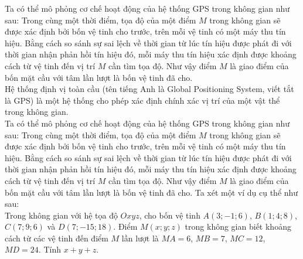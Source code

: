 \begin{bt}
{
	}
	Ta có thể mô phỏng cơ chế hoạt động của hệ thống GPS trong không gian như sau: Trong cùng một thời điểm, tọa độ của một điểm $M$ trong không gian sẽ được xác định bởi bốn vệ tinh cho trước, trên mỗi vệ tinh có một máy thu tín hiệu. Bằng cách so sánh sự sai lệch về thời gian từ lúc tín hiệu được phát đi với thời gian nhận phản hồi tín hiệu đó, mỗi máy thu tín hiệu xác định được khoảng cách từ vệ tinh đến vị trí $M$ cần tìm tọa độ. Như vậy điểm $M$ là giao điểm của bốn mặt cầu với tâm lần lượt là bốn vệ tinh đã cho.	\\
	Hệ thống định vị toàn cầu (tên tiếng Anh là Global Positioning System, viết tắt là GPS) là một hệ thống cho phép xác định chính xác vị trí của một vật thể trong không gian.\\
	Ta có thể mô phỏng cơ chế hoạt động của hệ thống GPS trong không gian như sau: Trong cùng một thời điểm, tọa độ của một điểm $M$ trong không gian sẽ được xác định bởi bốn vệ tinh cho trước, trên mỗi vệ tinh có một máy thu tín hiệu. Bằng cách so sánh sự sai lệch về thời gian từ lúc tín hiệu được phát đi với thời gian nhận phản hồi tín hiệu đó, mỗi máy thu tín hiệu xác định được khoảng cách từ vệ tinh đến vị trí $M$ cần tìm tọa độ. Như vậy điểm $M$ là giao điểm của bốn mặt cầu với tâm lần lượt là bốn vệ tinh đã cho.	
	Ta xét một ví dụ cụ thể như sau$\colon$\\
	Trong không gian với hệ tọa độ $Oxyz$, cho bốn vệ tinh $A(3;-1;6)$, $B(1;4;8)$, $C(7;9;6)$ và $D(7;-15;18)$. Điểm $M(x;y;z)$ trong không gian biết khoảng cách từ các vệ tinh đến điểm $M$ lần lượt là $MA=6$, $MB=7$, $MC=12$, $MD=24$. Tính $x+y+z$.
\end{bt}

